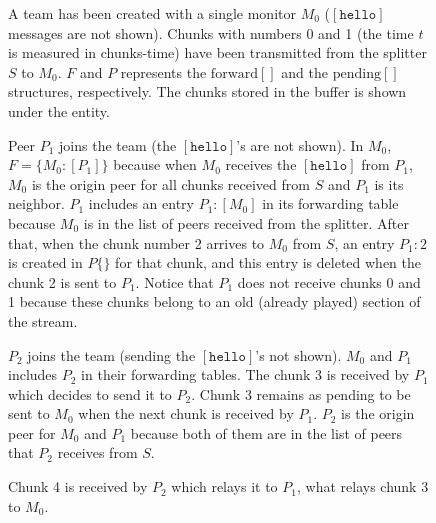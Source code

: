 \begin{center}
  \begin{figure}
     \caption{A team has been created
      with a single monitor $M_0$ ($[\mathtt{hello}]$ messages are not
      shown). Chunks with numbers 0 and 1 (the time $t$ is measured in
      chunks-time) have been transmitted from the splitter $S$ to
      $M_0$. $F$ and $P$ represents the $\text{forward}[]$ and the
      $\text{pending}[]$ structures, respectively. The chunks stored
      in the buffer is shown under the entity.\label{fig:team_0}}
  \end{figure}

  \begin{figure}
     \caption{Peer $P_1$ joins the team
      (the $[\mathtt{hello}]$'s are not shown). In $M_0$,
      $F=\{M_0:[P_1]\}$ because when $M_0$ receives the
      $[\mathtt{hello}]$ from $P_1$, $M_0$ is the origin peer for all
      chunks received from $S$ and $P_1$ is its neighbor. $P_1$
      includes an entry $P_1:[M_0]$ in its forwarding table because
      $M_0$ is in the list of peers received from the splitter. After
      that, when the chunk number 2 arrives to $M_0$ from $S$, an
      entry $P_1:2$ is created in $P\{\}$ for that chunk, and this
      entry is deleted when the chunk 2 is sent to $P_1$. Notice that
      $P_1$ does not receive chunks 0 and 1 because these chunks
      belong to an old (already played) section of the
      stream.\label{fig:team_1}}
  \end{figure}

  \begin{figure}
     \caption{$P_2$ joins the team
      (sending the $[\mathtt{hello}]$'s not shown). $M_0$ and $P_1$
      includes $P_2$ in their forwarding tables. The chunk 3 is
      received by $P_1$ which decides to send it to $P_2$. Chunk 3
      remains as pending to be sent to $M_0$ when the next chunk is
      received by $P_1$. $P_2$ is the origin peer for $M_0$ and $P_1$
      because both of them are in the list of peers that $P_2$
      receives from $S$. \label{fig:team_2}}
  \end{figure}

  \begin{figure}
     \caption{Chunk 4 is received by
      $P_2$ which relays it to $P_1$, what relays chunk 3 to
      $M_0$.\label{fig:team_3}}
  \end{figure}


\end{center}
